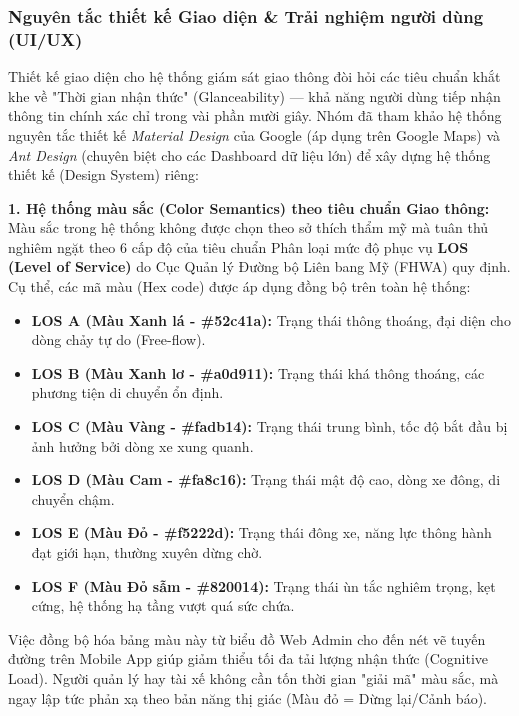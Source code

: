 \subsubsection{Nguyên tắc thiết kế Giao diện \& Trải nghiệm người dùng (UI/UX)}

Thiết kế giao diện cho hệ thống giám sát giao thông đòi hỏi các tiêu chuẩn khắt khe về "Thời gian nhận thức" (Glanceability) — khả năng người dùng tiếp nhận thông tin chính xác chỉ trong vài phần mười giây. Nhóm đã tham khảo hệ thống nguyên tắc thiết kế \textit{Material Design} của Google (áp dụng trên Google Maps) và \textit{Ant Design} (chuyên biệt cho các Dashboard dữ liệu lớn) để xây dựng hệ thống thiết kế (Design System) riêng:

\textbf{1. Hệ thống màu sắc (Color Semantics) theo tiêu chuẩn Giao thông:}
Màu sắc trong hệ thống không được chọn theo sở thích thẩm mỹ mà tuân thủ nghiêm ngặt theo 6 cấp độ của tiêu chuẩn Phân loại mức độ phục vụ \textbf{LOS (Level of Service)} do Cục Quản lý Đường bộ Liên bang Mỹ (FHWA) quy định. Cụ thể, các mã màu (Hex code) được áp dụng đồng bộ trên toàn hệ thống:
\begin{itemize}
    \item \textbf{LOS A (Màu Xanh lá - \#52c41a):} Trạng thái thông thoáng, đại diện cho dòng chảy tự do (Free-flow).
    \item \textbf{LOS B (Màu Xanh lơ - \#a0d911):} Trạng thái khá thông thoáng, các phương tiện di chuyển ổn định.
    \item \textbf{LOS C (Màu Vàng - \#fadb14):} Trạng thái trung bình, tốc độ bắt đầu bị ảnh hưởng bởi dòng xe xung quanh.
    \item \textbf{LOS D (Màu Cam - \#fa8c16):} Trạng thái mật độ cao, dòng xe đông, di chuyển chậm.
    \item \textbf{LOS E (Màu Đỏ - \#f5222d):} Trạng thái đông xe, năng lực thông hành đạt giới hạn, thường xuyên dừng chờ.
    \item \textbf{LOS F (Màu Đỏ sẫm - \#820014):} Trạng thái ùn tắc nghiêm trọng, kẹt cứng, hệ thống hạ tầng vượt quá sức chứa.
\end{itemize}
Việc đồng bộ hóa bảng màu này từ biểu đồ Web Admin cho đến nét vẽ tuyến đường trên Mobile App giúp giảm thiểu tối đa tải lượng nhận thức (Cognitive Load). Người quản lý hay tài xế không cần tốn thời gian "giải mã" màu sắc, mà ngay lập tức phản xạ theo bản năng thị giác (Màu đỏ = Dừng lại/Cảnh báo).

